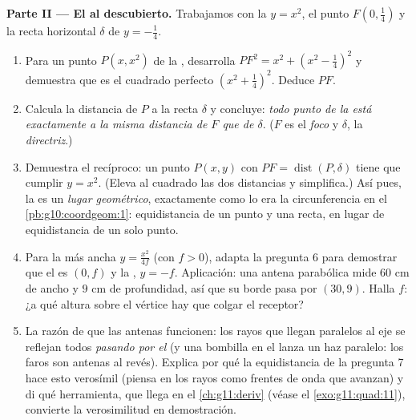 \begin{problem}
\medskip
\noindent\textbf{Parte II --- El  al descubierto.}
Trabajamos con la  $y = x^2$, el punto
$F\left(0, \frac14\right)$ y la recta horizontal $\delta$ de 
$y = -\frac14$.
\begin{enumerate}[resume]
  \item Para un punto $P(x, x^2)$ de la , desarrolla
        $PF^2 = x^2 + \left(x^2 - \frac14\right)^2$ y demuestra que es el
        cuadrado perfecto $\left(x^2 + \frac14\right)^2$. Deduce $PF$.
  \item Calcula la distancia de $P$ a la recta $\delta$ y concluye:
        \emph{todo punto de la  está exactamente a la misma
        distancia de $F$ que de $\delta$}. ($F$ es el
        \emph{foco} y $\delta$, la
        \emph{directriz}.)
  \item Demuestra el recíproco: un punto $P(x, y)$ con
        $PF = \operatorname{dist}(P, \delta)$ tiene que cumplir
        $y = x^2$. (Eleva al cuadrado las dos distancias y simplifica.)
        Así pues, la  es un \emph{lugar geométrico}, exactamente
        como lo era la circunferencia en el \cref{pb:g10:coordgeom:1}:
        equidistancia de un punto y una recta, en lugar de equidistancia
        de un solo punto.
  \item Para la  más ancha $y = \frac{x^2}{4f}$ (con $f > 0$),
        adapta la pregunta 6 para demostrar que el  es $(0, f)$ y la
        , $y = -f$. Aplicación: una antena parabólica mide $60$
        cm de ancho y $9$ cm de profundidad, así que su borde pasa por
        $(30, 9)$. Halla $f$: ¿a qué altura sobre el vértice hay que
        colgar el receptor?
  \item La razón de que las antenas funcionen: los rayos que llegan
        paralelos al eje se reflejan todos \emph{pasando por el } (y
        una bombilla en el  lanza un haz paralelo: los faros son
        antenas al revés). Explica por qué la equidistancia de la pregunta
        7 hace esto verosímil (piensa en los rayos como frentes de onda
        que avanzan) y di qué herramienta, que llega en el
        \cref{ch:g11:deriv} (véase el \cref{exo:g11:quad:11}), convierte
        la verosimilitud en demostración.
\end{enumerate}


\end{problem}
